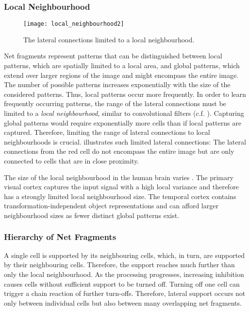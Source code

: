\subsubsection{Local Neighbourhood}
\begin{figure}[h]
    \centering
    \texttt{[image: local\_neighbourhood2]}
    \caption[Lateral connections limited to a local neighbourhood]{The lateral connections limited to a local neighbourhood.}
\end{figure}
Net fragments represent patterns that can be distinguished between local patterns, which are spatially limited to a local area, and global patterns, which extend over larger regions of the image and might encompass the entire image.
The number of possible patterns increases exponentially with the size of the considered patterns. Thus, local patterns occur more frequently.
In order to learn frequently occurring patterns, the range of the lateral connections must be limited to a \emph{local neighbourhood}, similar to convolutional filters (c.f. ).
Capturing global patterns would require exponentially more cells than if local patterns are captured. Therefore, limiting the range of lateral connections to local neighbourhoods is crucial.
 illustrates such limited lateral connections: The lateral connections from the red cell do not encompass the entire image but are only connected to cells that are in close proximity.

The size of the local neighbourhood in the human brain varies .
The primary visual cortex captures the input signal with a high local variance and therefore has a strongly limited local neighbourhood size. The temporal cortex contains transformation-independent object representations and can afford larger neighbourhood sizes as fewer distinct global patterns exist.

\subsubsection{Hierarchy of Net Fragments}
A single cell is supported by its neighbouring cells, which, in turn, are supported by their neighbouring cells. Therefore, the support reaches much further than only the local neighbourhood.
As the processing progresses, increasing inhibition causes cells without sufficient support to be turned off. Turning off one cell can trigger a chain reaction of further turn-offs. Therefore, lateral support occurs not only between individual cells but also between many overlapping net fragments.


